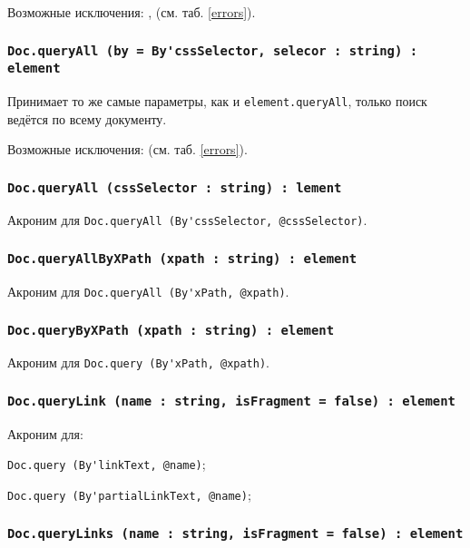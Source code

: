 Возможные исключения: ,  (см. таб. \ref{errors}).

\subsubsection{\lstinline|Doc.queryAll (by = By'cssSelector, selecor : string) : element|}

Принимает то же самые параметры, как и \lstinline|element.queryAll|, только поиск ведётся по всему документу. 

Возможные исключения:  (см. таб. \ref{errors}).

\subsubsection{\lstinline|Doc.queryAll (cssSelector : string) : lement|}

Акроним для \lstinline|Doc.queryAll (By'cssSelector, @cssSelector)|.

\subsubsection{\lstinline|Doc.queryAllByXPath (xpath : string) : element|}

Акроним для \lstinline|Doc.queryAll (By'xPath, @xpath)|.

\subsubsection{\lstinline|Doc.queryByXPath (xpath : string) : element|}

Акроним для \lstinline|Doc.query (By'xPath, @xpath)|.

\subsubsection{\lstinline|Doc.queryLink (name : string, isFragment = false) : element|}

Акроним для:
\begin{icItems}
	\item \lstinline|Doc.query (By'linkText, @name)|;
	\item \lstinline|Doc.query (By'partialLinkText, @name)|;
\end{icItems}

\subsubsection{\lstinline|Doc.queryLinks (name : string, isFragment = false) : element|}

